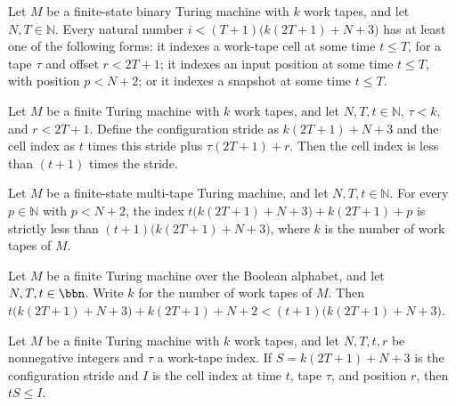 \begin{theorem}
\label{Complexity.cfgIdx_cases}
\leanok
{}
Let $M$ be a finite-state binary Turing machine with $k$ work tapes, and let
$N,T\in\mathbb N$. Every natural number $i<(T+1)\bigl(k(2T+1)+N+3\bigr)$ has at least
one of the following forms: it indexes a work-tape cell at some time $t\le T$, for a
tape $\tau$ and offset $r<2T+1$; it indexes an input position at some time $t\le T$,
with position $p<N+2$; or it indexes a snapshot at some time $t\le T$.
\end{theorem}

\begin{theorem}
\label{Complexity.cellIdx_lt_succ}
\leanok
{}
Let $M$ be a finite Turing machine with $k$ work tapes, and let $N,T,t\in\mathbb{N}$,
$\tau<k$, and $r<2T+1$. Define the configuration stride as $k(2T+1)+N+3$ and the cell
index as $t$ times this stride plus $\tau(2T+1)+r$. Then the cell index is less than
$(t+1)$ times the stride.
\end{theorem}

\begin{theorem}
\label{Complexity.inpIdx_lt_succ}
\leanok
{}
Let $M$ be a finite-state multi-tape Turing machine, and let $N,T,t\in\mathbb N$. For
every $p\in\mathbb N$ with $p<N+2$, the index $t\bigl(k(2T+1)+N+3\bigr)+k(2T+1)+p$ is
strictly less than $(t+1)\bigl(k(2T+1)+N+3\bigr)$, where $k$ is the number of work tapes
of $M$.
\end{theorem}

\begin{theorem}
\label{Complexity.snapIdx_lt_succ}
\leanok
{}
Let $M$ be a finite Turing machine over the Boolean alphabet, and let $N,T,t\in\bbn$.
Write $k$ for the number of work tapes of $M$. Then
$t\bigl(k(2T+1)+N+3\bigr)+k(2T+1)+N+2 < (t+1)\bigl(k(2T+1)+N+3\bigr)$.
\end{theorem}

\begin{theorem}
\label{Complexity.le_cellIdx}
\leanok
{}
Let $M$ be a finite Turing machine with $k$ work tapes, and let $N,T,t,r$ be nonnegative
integers and $\tau$ a work-tape index. If $S=k(2T+1)+N+3$ is the configuration stride
and $I$ is the cell index at time $t$, tape $\tau$, and position $r$, then $tS\le I$.
\end{theorem}

